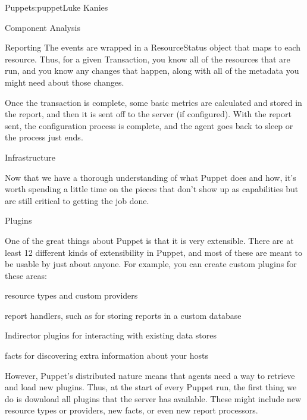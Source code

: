 \begin{aosachapter}{Puppet}{s:puppet}{Luke Kanies}
\begin{aosasect1}{Component Analysis}
\begin{aosasect2}{Reporting}
The events are wrapped in a ResourceStatus object that maps to each
resource.  Thus, for a given Transaction, you know all of the
resources that are run, and you know any changes that happen, along
with all of the metadata you might need about those changes.

Once the transaction is complete, some basic metrics are calculated
and stored in the report, and then it is sent off to the server (if
configured).  With the report sent, the configuration process is
complete, and the agent goes back to sleep or the process just ends.

\end{aosasect2}

\end{aosasect1}

\begin{aosasect1}{Infrastructure}

Now that we have a thorough understanding of what Puppet does and how,
it's worth spending a little time on the pieces that don't
show up as capabilities but are still critical to getting the job
done.

\begin{aosasect2}{Plugins}

One of the great things about Puppet is that it is very
extensible.  There are at least 12 different kinds of extensibility in
Puppet, and most of these are meant to be usable by just about anyone.
For example, you can create custom plugins for these areas:

\begin{aosaitemize}

\item resource types and custom providers

\item report handlers, such as for storing reports in a custom
  database

\item Indirector plugins for interacting with existing data stores

\item facts for discovering extra information about your hosts

\end{aosaitemize}

However, Puppet's distributed nature means that agents need a way to
retrieve and load new plugins.  Thus, at the start of every Puppet
run, the first thing we do is download all plugins that the server has
available.  These might include new resource types or providers, new
facts, or even new report processors.


\end{aosasect2}
\end{aosasect1}
\end{aosachapter}
